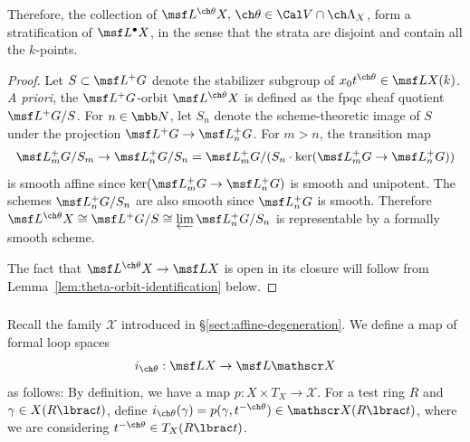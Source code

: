 \documentclass[final]{amsart}
\theoremstyle{remark}
\theoremstyle{definition}
\numberwithin{equation}{section}
\begin{document}
Therefore, the collection of  
$\msf L^{\ch\theta}X,\, \ch\theta \in \Cal V \cap \ch\Lambda_X$, 
form a stratification of $\msf L^\bullet X$, in the sense that the strata are disjoint
and contain all the $k$-points.

\begin{proof}
Let $S \subset \msf L^+G$ denote the stabilizer subgroup of $x_0 t^{\ch\theta}
\in \msf L X(k)$. 
\emph{A priori}, the $\msf L^+G$-orbit $\msf L^{\ch\theta} X$ is 
defined as the fpqc sheaf quotient $\msf L^+G/S$. 
For $n \in \mbb N$, let $S_n$ denote the scheme-theoretic image 
of $S$ under the projection $\msf L^+G \to \msf L^+_n G$. 
For $m > n$, the transition map 
\[ \msf L^+_m G / S_m \to \msf L^+_n G / S_n = \msf L^+_m G / (S_n \cdot \ker(\msf L^+_m G \to \msf L^+_n G)) \]
is smooth affine since $\ker(\msf L^+_m G \to \msf L^+_n G)$ is smooth and unipotent. 
The schemes $\msf L^+_n G/S_n$ are also smooth since $\msf L^+_n G$ is smooth. 
Therefore $\msf L^{\ch\theta} X \cong \msf L^+ G / S \cong \varprojlim 
\msf L^+_n G / S_n$ is representable by a formally smooth scheme.

The fact that $\msf L^{\ch\theta} X \to \msf L X$ is open in its closure
will follow from Lemma~\ref{lem:theta-orbit-identification} below.
\end{proof}



\subsubsection{}
Recall the family $\mathscr X$ introduced in \S \ref{sect:affine-degeneration}. We define a map of formal loop spaces 
\begin{equation}\label{e:ithetaLX} 
    i_{\ch\theta} : \msf L X \to \msf L \mathscr X 
\end{equation}
as follows:
By definition, we have a map $p: X \times T_X \to \mathscr X$. 
For a test ring $R$ and $\gamma \in X( R \lbrac t)$, 
define $i_{\ch\theta}(\gamma) = p( \gamma, t^{-\ch\theta} ) \in \mathscr X(R \lbrac t)$,
where we are considering $t^{-\ch\theta} \in T_X(R \lbrac t)$.
\end{document}
